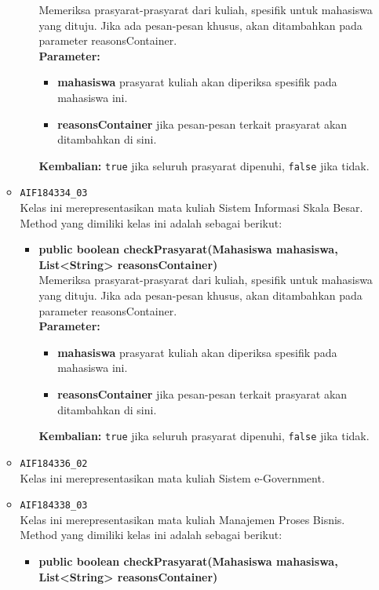 \begin{enumerate}
\begin{itemize}
\begin{itemize}
			Memeriksa prasyarat-prasyarat dari kuliah, spesifik untuk mahasiswa yang dituju. Jika ada pesan-pesan khusus, akan ditambahkan pada parameter reasonsContainer.\\
			\textbf{Parameter:}
			\begin{itemize}
				\item \textbf{mahasiswa} prasyarat kuliah akan diperiksa spesifik pada mahasiswa ini.
				\item \textbf{reasonsContainer} jika pesan-pesan terkait prasyarat akan ditambahkan di sini.
			\end{itemize}
			\textbf{Kembalian:} \texttt{true} jika seluruh prasyarat dipenuhi, \texttt{false} jika tidak.
		\end{itemize}
		\item \texttt{AIF184334\_03} \\
		Kelas ini merepresentasikan mata kuliah Sistem Informasi Skala Besar. Method yang dimiliki kelas ini adalah sebagai berikut: 
		\begin{itemize}
			\item \textbf{public boolean checkPrasyarat(Mahasiswa mahasiswa, List<String> reasonsContainer)}\\
			Memeriksa prasyarat-prasyarat dari kuliah, spesifik untuk mahasiswa yang dituju. Jika ada pesan-pesan khusus, akan ditambahkan pada parameter reasonsContainer.\\
			\textbf{Parameter:}
			\begin{itemize}
				\item \textbf{mahasiswa} prasyarat kuliah akan diperiksa spesifik pada mahasiswa ini.
				\item \textbf{reasonsContainer} jika pesan-pesan terkait prasyarat akan ditambahkan di sini.
			\end{itemize}
			\textbf{Kembalian:} \texttt{true} jika seluruh prasyarat dipenuhi, \texttt{false} jika tidak.
		\end{itemize}
		\item \texttt{AIF184336\_02} \\
		Kelas ini merepresentasikan mata kuliah Sistem e-Government.
		\item \texttt{AIF184338\_03} \\
		Kelas ini merepresentasikan mata kuliah Manajemen Proses Bisnis. Method yang dimiliki kelas ini adalah sebagai berikut: 
		\begin{itemize}
			\item \textbf{public boolean checkPrasyarat(Mahasiswa mahasiswa, List<String> reasonsContainer)}\\

\end{itemize}
\end{itemize}
\end{enumerate}
